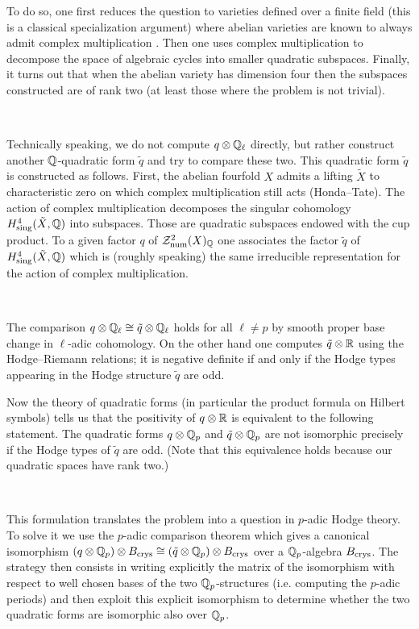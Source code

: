 \documentclass[11pt]{amsart}
\begin{document}
To do so, one first   reduces the question to varieties defined over a finite field (this is a classical specialization argument) where abelian varieties are known to always  admit complex multiplication \cite{Tate}.  Then one uses complex multiplication to decompose the space of algebraic cycles into smaller quadratic subspaces. Finally,  it turns out that  when the abelian variety has dimension four then   the subspaces constructed are of rank two (at least those where the problem is not trivial).

\


Technically speaking, we do not compute $q \otimes \mathbb{Q}_\ell$ directly, but rather construct another $\mathbb{Q}$-quadratic form $\tilde{q}$ and try to compare these two. This quadratic form $\tilde{q}$ is constructed as follows. First, the abelian fourfold $X$ admits a lifting $\tilde{X}$ to characteristic zero on which  complex multiplication still acts (Honda--Tate). The action of  complex multiplication  decomposes the singular cohomology  $H_{\mathrm{sing}}^4(\tilde{X},\mathbb{Q})$ into subspaces. Those are quadratic subspaces endowed with the cup product. To a given factor $q$ of $\mathcal{Z}^2_{\mathrm{num}}(X)_{\mathbb{Q}}$ one associates the factor $\tilde{q}$  of $H_{\mathrm{sing}}^4(\tilde{X},\mathbb{Q})$ which is (roughly speaking) the same irreducible representation for the action of  complex multiplication.

\

The comparison  $q \otimes \mathbb{Q}_\ell \cong \tilde{q}\otimes \mathbb{Q}_\ell$ holds for all $\ell \neq p$   by smooth proper base change in $\ell$-adic cohomology.  On the other hand one computes $\tilde{q} \otimes \mathbb{R}$ using the Hodge--Riemann relations; it is negative definite if and only if the Hodge types appearing in the Hodge structure $\tilde{q}$ are odd. 

Now the theory of quadratic forms (in particular the product formula on Hilbert symbols) tells us that the positivity of $q \otimes \mathbb{R}$ is equivalent to the following statement. The quadratic forms $q \otimes \mathbb{Q}_p $ and $\tilde{q}\otimes \mathbb{Q}_p$ are   not isomorphic  precisely   if the Hodge types of $\tilde{q}$ are odd. (Note that this equivalence holds because our quadratic spaces have rank two.)

\

This formulation translates the  problem into a question in $p$-adic Hodge theory. To solve it we use the $p$-adic comparison theorem which gives a canonical isomorphism $(q\otimes \mathbb{Q}_p) \otimes B_{\textnormal{crys}} \cong (\tilde{q}\otimes \mathbb{Q}_p) \otimes B_{\textnormal{crys}}$ over a   $\mathbb{Q}_p$-algebra $B_{\textnormal{crys}}$. The strategy then consists in  writing explicitly the matrix of the isomorphism with respect to  well chosen bases of the two $\mathbb{Q}_p$-structures (i.e. computing the $p$-adic periods) and then exploit this explicit isomorphism to determine whether the two quadratic forms are  isomorphic also over $\mathbb{Q}_p$. 
\end{document}
